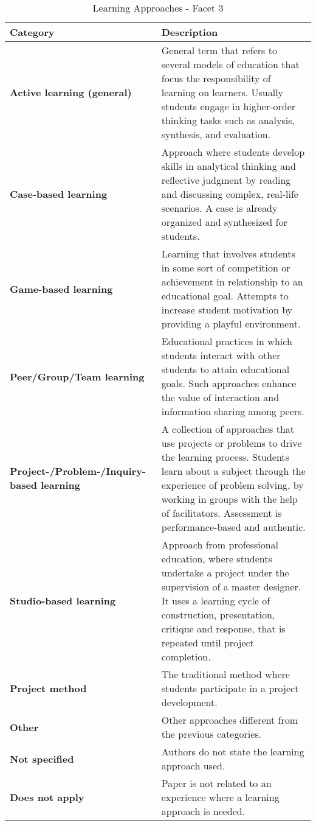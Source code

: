 \begin{table*}
	\centering
	\caption {Learning Approaches - Facet 3}  
		{\begin{tabular}{ p{1.5in} | p{3.7in} }
			\bf Category & \bf Description \\
			\hline

			\bf Active learning (general) & General term that refers to several models of education that focus the responsibility of learning on learners. Usually students engage in higher-order thinking tasks such as analysis, synthesis, and evaluation. \\
			\bf Case-based learning & Approach where students develop skills in analytical thinking and reflective judgment by reading and discussing complex, real-life scenarios. A case is already organized and synthesized for students. \\
			\bf Game-based learning & Learning that involves students in some sort of competition or achievement in relationship to an educational goal. Attempts to increase student motivation by providing a playful environment. \\
			\bf Peer/Group/Team learning & Educational practices in which students interact with other students to attain educational goals. Such approaches enhance the value of interaction and information sharing among peers. \\
			\bf Project-/Problem-/Inquiry-based learning & A collection of approaches that use projects or problems to drive the learning process. Students learn about a subject through the experience of problem solving, by working in groups with the help of facilitators. Assessment is performance-based and authentic. \\
			\bf Studio-based learning & Approach from professional education, where students undertake a project under the supervision of a master designer. It uses a learning cycle of construction, presentation, critique and response, that is repeated until project completion. \\
			\bf Project method &  The traditional method where students participate in a project development. \\
			\bf Other & Other approaches different from the previous categories.\\
			\bf Not specified & Authors do not state the learning approach used. \\
			\bf Does not apply & Paper is not related to an experience where a learning approach is needed. \\
		\end{tabular}}
		\label{tab:activeLearning}
\end{table*}
